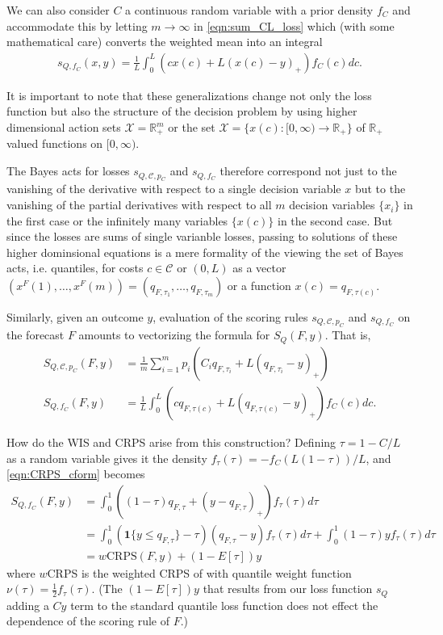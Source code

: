 \documentclass{article}
\begin{document}
We can also consider $C$ a continuous random variable with a prior density $f_C$ and accommodate this by letting $m \to \infty$ in \eqref{eqn:sum_CL_loss} 
which (with some mathematical care) converts the weighted mean into an integral
\begin{align}
s_{Q,f_C}(x,y) = \frac{1}{L}\int_{0}^{L} (cx(c) + L(x(c) - y)_+) f_C(c)dc{}.
\end{align}

It is important to note that these generalizations change not only the loss function but also the structure of the decision problem by using higher dimensional action sets $\mathcal{X}= \mathbb{R}_+^m$ or the set $\mathcal{X} = \{x(c):[0,\infty) \to \mathbb{R}_+\}$ of $\mathbb{R}_+$ valued functions on $[0,\infty)$.

The Bayes acts for losses $s_{Q,\mathcal{C}, p_C}$ and $s_{Q,f_C}$ therefore correspond not just to the vanishing of the derivative with respect to a single
decision variable $x$ but to the vanishing of the partial derivatives with respect to all $m$ decision variables $\{x_i\}$ in the first case or the infinitely many variables $\{x(c)\}$ in the second case.  But since the losses are sums of single varianble losses, passing to solutions of these higher dominsional equations is a mere formality of the viewing the set of Bayes acts, i.e. quantiles, for costs $c \in \mathcal{C}$ or $(0,L)$ as a vector 
$(x^F(1),\ldots,x^F(m))=(q_{F,\tau_1},\ldots,q_{F,\tau_m})$ or a function $x(c) = q_{F,\tau(c)}$.

Similarly, given an outcome $y$, evaluation of the scoring rules $s_{Q,\mathcal{C}, p_C}$ and $s_{Q,f_C}$ on the forecast $F$ amounts to vectorizing the
formula for $S_Q(F,y)$. That is,
\begin{align}
S_{Q,\mathcal{C}, p_C}(F,y) &= \frac{1}{m}\sum_{i=1}^{m}p_i(C_i q_{F,\tau_i} + L(q_{F,\tau_i} - y)_+) \\
S_{Q, f_C}(F,y) &= \frac{1}{L}\int_{0}^{L}(cq_{F,\tau(c)} + L(q_{F,\tau(c)} - y)_+) f_C(c)dc. \label{eqn:CRPS_cform}
\end{align}

How do the WIS and CRPS arise from this construction? Defining $\tau = 1-C/L$ as a random variable gives it the density 
$f_{\tau}(\tau) = -f_C\left(L(1-\tau)\right)/L$, 
and \eqref{eqn:CRPS_cform} becomes 
\begin{align}
S_{Q, f_C}(F,y) &= \int_{0}^{1}((1-\tau)q_{F,\tau} + (y-q_{F,\tau})_{+})f_{\tau}(\tau)d\tau \\
&= \int_{0}^{1}(\mathbf{1}\{y \leq q_{F,\tau}\}-\tau)(q_{F,\tau} - y)f_{\tau}(\tau)d\tau + \int_{0}^{1}(1-\tau)y f_{\tau}(\tau)d\tau \\
&= w\mathrm{CRPS}(F,y) + (1-E[\tau])y
\end{align}
where $w$CRPS is the weighted CRPS of \cite{gneiting2011weightedScoringRules} with quantile weight function $\nu(\tau) = \frac{1}{2}f_{\tau}(\tau)$. 
(The $(1-E[\tau])y$ that results from our loss function $s_Q$ adding a $Cy$ term to the standard quantile loss function does not effect the dependence of the scoring rule of $F$.)
\end{document}
